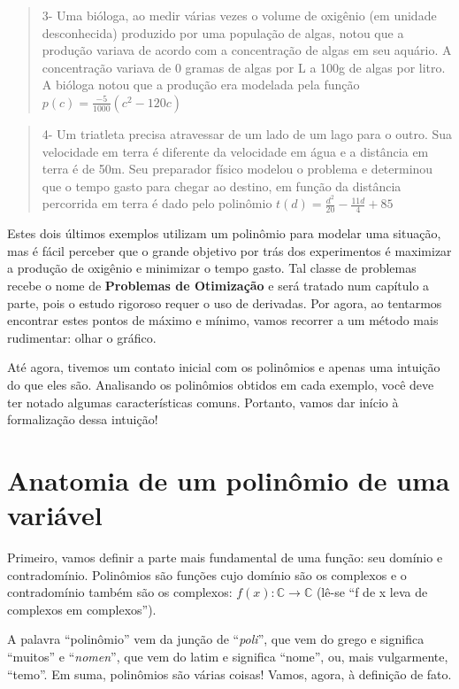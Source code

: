 \documentclass[
  portuguese,
  letterpaper,
  DIV=11,
  numbers=noendperiod]{scrreport}
\begin{document}
\begin{quote}
3- Uma bióloga, ao medir várias vezes o volume de oxigênio (em unidade
desconhecida) produzido por uma população de algas, notou que a produção
variava de acordo com a concentração de algas em seu aquário. A
concentração variava de 0 gramas de algas por L a 100g de algas por
litro. A bióloga notou que a produção era modelada pela função
\(p(c) = \frac{-5}{1000}(c^2-120c)\)
\end{quote}

\begin{quote}
4- Um triatleta precisa atravessar de um lado de um lago para o outro.
Sua velocidade em terra é diferente da velocidade em água e a distância
em terra é de 50m. Seu preparador físico modelou o problema e determinou
que o tempo gasto para chegar ao destino, em função da distância
percorrida em terra é dado pelo polinômio
\(t(d) = \frac{d^2}{20}-\frac{11d}{4}+85\)
\end{quote}

Estes dois últimos exemplos utilizam um polinômio para modelar uma
situação, mas é fácil perceber que o grande objetivo por trás dos
experimentos é maximizar a produção de oxigênio e minimizar o tempo
gasto. Tal classe de problemas recebe o nome de \textbf{Problemas de
Otimização} e será tratado num capítulo a parte, pois o estudo rigoroso
requer o uso de derivadas. Por agora, ao tentarmos encontrar estes
pontos de máximo e mínimo, vamos recorrer a um método mais rudimentar:
olhar o gráfico.

Até agora, tivemos um contato inicial com os polinômios e apenas uma
intuição do que eles são. Analisando os polinômios obtidos em cada
exemplo, você deve ter notado algumas características comuns. Portanto,
vamos dar início à formalização dessa intuição!

\section{Anatomia de um polinômio de uma
variável}\label{anatomia-de-um-polinuxf4mio-de-uma-variuxe1vel}

Primeiro, vamos definir a parte mais fundamental de uma função: seu
domínio e contradomínio. Polinômios são funções cujo domínio são os
complexos e o contradomínio também são os complexos:
\(f(x): \mathbb{C} \to\mathbb{C}\) (lê-se ``f de x leva de complexos em
complexos'').

A palavra ``polinômio'' vem da junção de ``\emph{poli}'', que vem do
grego e significa ``muitos'' e ``\emph{nomen}'', que vem do latim e
significa ``nome'', ou, mais vulgarmente, ``temo''. Em suma, polinômios
são várias coisas! Vamos, agora, à definição de fato.
\end{document}
